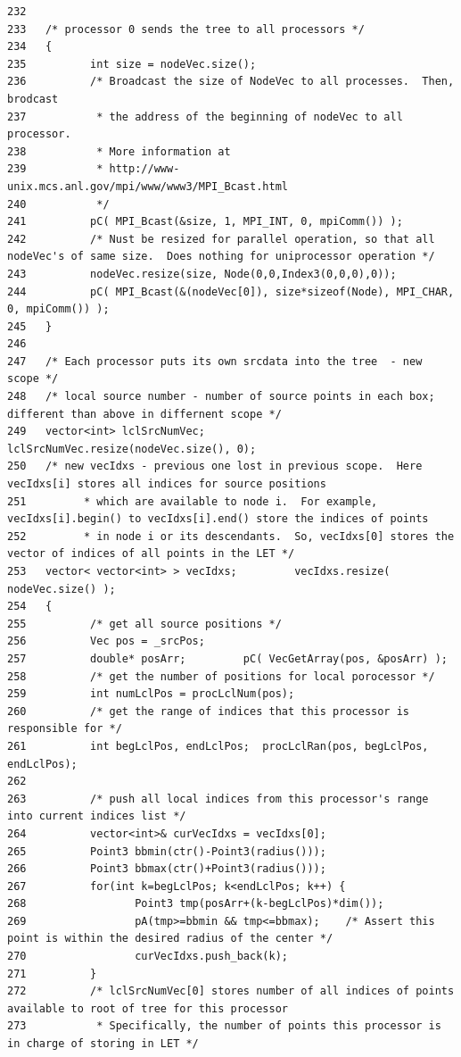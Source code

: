 \begin{verbatim}
232   
233   /* processor 0 sends the tree to all processors */
234   {
235          int size = nodeVec.size();
236          /* Broadcast the size of NodeVec to all processes.  Then, brodcast
237           * the address of the beginning of nodeVec to all processor.
238           * More information at 
239           * http://www-unix.mcs.anl.gov/mpi/www/www3/MPI_Bcast.html
240           */
241          pC( MPI_Bcast(&size, 1, MPI_INT, 0, mpiComm()) );
242          /* Nust be resized for parallel operation, so that all nodeVec's of same size.  Does nothing for uniprocessor operation */
243          nodeVec.resize(size, Node(0,0,Index3(0,0,0),0));
244          pC( MPI_Bcast(&(nodeVec[0]), size*sizeof(Node), MPI_CHAR, 0, mpiComm()) );
245   }
246 
247   /* Each processor puts its own srcdata into the tree  - new scope */
248   /* local source number - number of source points in each box; different than above in differnent scope */
249   vector<int> lclSrcNumVec;      lclSrcNumVec.resize(nodeVec.size(), 0);
250   /* new vecIdxs - previous one lost in previous scope.  Here vecIdxs[i] stores all indices for source positions
251         * which are available to node i.  For example, vecIdxs[i].begin() to vecIdxs[i].end() store the indices of points
252         * in node i or its descendants.  So, vecIdxs[0] stores the vector of indices of all points in the LET */
253   vector< vector<int> > vecIdxs;         vecIdxs.resize( nodeVec.size() );
254   { 
255          /* get all source positions */
256          Vec pos = _srcPos;
257          double* posArr;         pC( VecGetArray(pos, &posArr) );
258          /* get the number of positions for local porocessor */
259          int numLclPos = procLclNum(pos);
260          /* get the range of indices that this processor is responsible for */
261          int begLclPos, endLclPos;  procLclRan(pos, begLclPos, endLclPos);
262 
263          /* push all local indices from this processor's range into current indices list */
264          vector<int>& curVecIdxs = vecIdxs[0];
265          Point3 bbmin(ctr()-Point3(radius()));
266          Point3 bbmax(ctr()+Point3(radius()));  
267          for(int k=begLclPos; k<endLclPos; k++) {
268                 Point3 tmp(posArr+(k-begLclPos)*dim());
269                 pA(tmp>=bbmin && tmp<=bbmax);    /* Assert this point is within the desired radius of the center */
270                 curVecIdxs.push_back(k);
271          }
272          /* lclSrcNumVec[0] stores number of all indices of points available to root of tree for this processor
273           * Specifically, the number of points this processor is in charge of storing in LET */

\end{verbatim}
